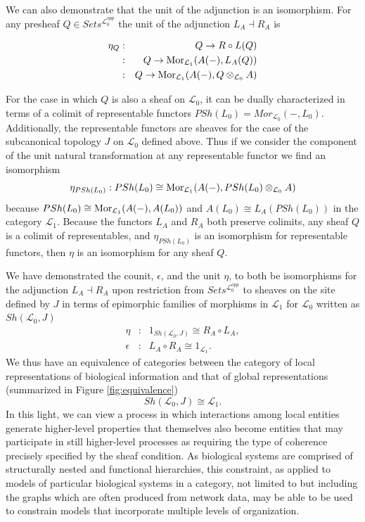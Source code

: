 \documentclass[aps,twocolumn]{revtex4-1}
\begin{document}
We can also demonstrate that the unit of the adjunction is an isomorphism. For any presheaf $Q \in Sets^{\mathcal{L}_0^{opp}}$ the unit of the adjunction $L_A \dashv R_A$ is 

\begin{eqnarray*}
\eta_{Q} &:& Q \rightarrow R \circ L(Q)\\
&:& Q \rightarrow \mathop{\rm Mor}\nolimits_{\mathcal{L}_1}(A(-),L_A(Q))\\ 
&:& Q \rightarrow \mathop{\rm Mor}\nolimits_{\mathcal{L}_1}(A(-), Q \otimes_{\mathcal{L}_0} A)
\end{eqnarray*}

For the case in which $Q$ is also a sheaf on $\mathcal{L}_0$, it can be dually characterized in terms of a colimit of representable functors $PSh(L_0) = Mor_{\mathcal{L}_0}(-,L_0)$. Additionally, the representable functors are sheaves for the case of the subcanonical topology $J$ on $\mathcal{L}_0$ defined above. Thus if we consider the component of the unit natural transformation at any representable functor we find an isomorphism
$$
\eta_{PSh(L_0)}: PSh(L_0) \cong \mathop{\rm Mor}\nolimits_{\mathcal{L}_1}(A(-), PSh(L_0) \otimes_{\mathcal{L}_0} A)
$$
because $PSh(L_0) \cong \mathop{\rm Mor}\nolimits_{\mathcal{L}_1}(A(-), A(L_0))$ and $A(L_0) \cong L_A(PSh(L_0))$ in the category $\mathcal{L}_1$. Because the functors $L_A$ and $R_A$ both preserve colimits, any sheaf $Q$ is a colimit of representables, and $\eta_{PSh(L_0)}$ is an isomorphism for representable functors, then $\eta$ is an isomorphism for any sheaf $Q$.

We have demonstrated the counit, $\epsilon$, and the unit $\eta$, to both be isomorphisms for the adjunction $L_A \dashv R_A$ upon restriction from $Sets^{\mathcal{L}_0^{opp}}$ to sheaves on the site defined by $J$ in terms of epimorphic families of morphisms in $\mathcal{L}_1$ for $\mathcal{L}_0$ written as $Sh(\mathcal{L}_0,J)$ 
\begin{eqnarray*}
\eta &:& 1_{Sh(\mathcal{L}_0,J)} \cong R_A \circ L_A,\\
\epsilon &:& L_A \circ R_A \cong 1_{\mathcal{L}_1}.
\end{eqnarray*}
We thus have an equivalence of categories between the category of local representations of biological information and that of global representations (summarized in Figure \ref{fig:equivalence})
$$
Sh(\mathcal{L}_0,J) \cong \mathcal{L}_1.
$$
In this light, we can view a process in which interactions among local entities generate higher-level properties that themselves also become entities that may participate in still higher-level processes as requiring the type of coherence precisely specified by the sheaf condition. As biological systems are comprised of structurally nested and functional hierarchies, this constraint, as applied to models of particular biological systems in a category, not limited to but including the graphs which are often produced from network data, may be able to be used to constrain models that incorporate multiple levels of organization.
\end{document}

